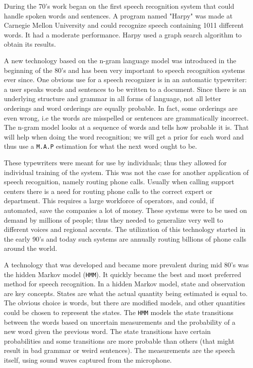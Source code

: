 \documentclass[a4paper,12pt,twoside]{ltxdoc}
\begin{document}
During the 70's work began on the first speech recognition system that could handle spoken words and sentences. A program named "Harpy" was made at Carnegie Mellon University and could recognize speech containing 1011 different words. It had a moderate performance. Harpy used a graph search algorithm to obtain its results. 

A new technology based on the n-gram language model was introduced in the beginning of the 80's and has been very important to speech recognition systems ever since. One obvious use for a speech recognizer is in an automatic typewriter: a user speaks words and sentences to be written to a document. Since there is an underlying structure and grammar in all forms of language, not all letter orderings and word orderings are equally probable. In fact, some orderings are even wrong, i.e the words are misspelled or sentences are grammatically incorrect. The n-gram model looks at a sequence of words and tells how probable it is. That will help when doing the word recognition; we will get a prior for each word and thus use a \verb#M.A.P# estimation for what the next word ought to be.

These typewriters were meant for use by individuals; thus they allowed for individual training of the system. This was not the case for another application of speech recognition, namely routing phone calls. Usually when calling support centers there is a need for routing phone calls to the correct expert or department. This requires a large workforce of operators, and could, if automated, save the companies a lot of money. These systems were to be used on demand by millions of people; thus they needed to generalize very well to different voices and regional accents. The utilization of this technology started in the early 90's and today such systems are annually routing billions of phone calls around the world. 

A technology that was developed and became more prevalent during mid 80's was the hidden Markov model (\verb#HMM#). It quickly became the best and most preferred method for speech recognition. In a hidden Markov model, state and observation are key concepts. States are what the actual quantity being estimated is equal to. The obvious choice is words, but there are modified models, and other quantities could be chosen to represent the states. The \verb#HMM# models the state transitions between the words based on uncertain measurements and the probability of a new word given the previous word. The state transitions have certain probabilities and some transitions are more probable than others (that might result in bad grammar or weird sentences).  The measurements are the speech itself, using sound waves captured from the microphone\cite{history}.
\end{document}

